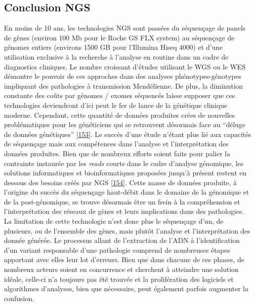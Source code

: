 \documentclass[12pt,twoside]{reedthesis}
\theoremstyle{definition}
\theoremstyle{definition}
\theoremstyle{remark}
\begin{document}
  \newpage
  
  \subsection{Conclusion NGS}\label{conclusion-ngs}
  
  En moins de 10 ans, les technologies NGS sont passées du séquençage de
  panels de gènes (environ 100 Mb pour le Roche GS FLX system) au
  séquençage de génomes entiers (environs 1500 GB pour l'Illumina Hiseq
  4000) et d'une utilisation exclusive à la recherche à l'analyse en
  routine dans un cadre de diagnostics cliniques. Le nombre croissant
  d'études utilisant le WGS ou le WES démontre le pouvoir de ces approches
  dans des analyses phénotypes-génotypes impliquant des pathologies à
  transmission Mendélienne. De plus, la diminution constante des coûts par
  génomes / exomes séquencés laisse supposer que ces technologies
  deviendront d'ici peut le fer de lance de la génétique clinique moderne.
  Cependant, cette quantité de données produites crées de nouvelles
  problématiques pour les généticiens qui se retrouvent désormais face au
  ``déluge de données génétiques''
  {[}\protect\hyperlink{ref-Schatz2013}{153}{]}. Le succès d'une étude
  n'étant plus lié aux capacités de séquençage mais aux compétences dans
  l'analyse et l'interprétation des données produites. Bien que de
  nombreux efforts soient faits pour palier la contrainte instaurée par
  les \emph{reads} courts dans le cadre d'analyse génomique, les solutions
  informatiques et bioinformatiques proposées jusqu'à présent restent en
  dessous des besoins créés par NGS
  {[}\protect\hyperlink{ref-McPherson2009}{154}{]}. Cette masse de données
  produite, à l'origine du succès du séquençage haut-débit dans le domaine
  de la génomique et de la post-génomique, se trouve désormais être un
  frein à la compréhension et l'interprétation des réseaux de gènes et
  leurs implications dans des pathologies. La limitation de cette
  technologie n'est donc plus le séquençage d'un, de plusieurs, ou de
  l'ensemble des gènes, mais plutôt l'analyse et l'interprétation des
  donnée générée. Le processus allant de l'extraction de l'ADN à
  l'identification d'un variant responsable d'une pathologie comprend de
  nombreuses étapes apportant avec elles leur lot d'erreurs. Bien que dans
  chacune de ces phases, de nombreux acteurs soient en concurrence et
  cherchent à atteindre une solution idéale, celle-ci n'a toujours pas été
  trouvée et la prolifération des logiciels et algorithmes d'analyses,
  bien que nécessaire, peut également parfois augmenter la confusion.
  
\end{document}
